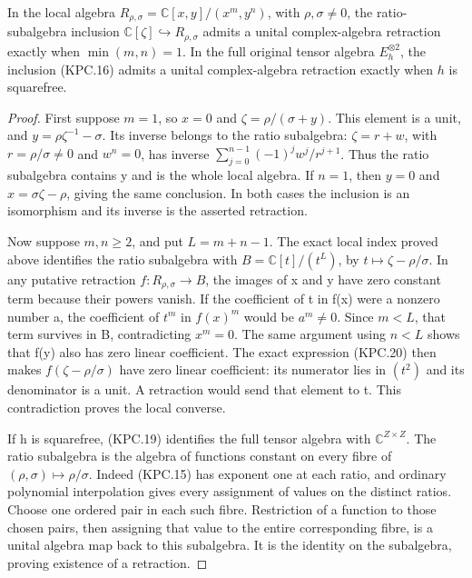 \begin{theorem}
In the local algebra
\(R_{\rho,\sigma}=\mathbb C[x,y]/(x^m,y^n)\), with
\(\rho,\sigma\ne0\), the ratio-subalgebra inclusion
\(\mathbb C[\zeta]\hookrightarrow R_{\rho,\sigma}\)
admits a unital complex-algebra retraction exactly when
\(\min(m,n)=1\).  In the full original tensor algebra
\(E_h^{\otimes2}\), the inclusion (KPC.16) admits a unital
complex-algebra retraction exactly when \(h\) is squarefree.
\end{theorem}

\begin{proof}
First suppose \(m=1\), so \(x=0\) and
\(\zeta=\rho/(\sigma+y)\).  This element is a unit,
and \(y=\rho\zeta^{-1}-\sigma\).  Its inverse belongs
to the ratio subalgebra: \(\zeta=r+w\), with
\(r=\rho/\sigma\ne0\) and \(w^n=0\), has inverse
\(\sum_{j=0}^{n-1}(-1)^jw^j/r^{j+1}\).
Thus the ratio subalgebra contains y and is the whole local
algebra.  If \(n=1\), then \(y=0\) and
\(x=\sigma\zeta-\rho\), giving the same conclusion.
In both cases the inclusion is an isomorphism and its inverse
is the asserted retraction.

Now suppose \(m,n\ge2\), and put \(L=m+n-1\).
The exact local index proved above identifies the ratio
subalgebra with \(B=\mathbb C[t]/(t^L)\), by
\(t\mapsto\zeta-\rho/\sigma\).
In any putative retraction \(f:R_{\rho,\sigma}\to B\),
the images of x and y have zero constant term because their
powers vanish.  If the coefficient of t in f(x) were a
nonzero number a, the coefficient of \(t^m\) in
\(f(x)^m\) would be \(a^m\ne0\).  Since \(m<L\),
that term survives in B, contradicting \(x^m=0\).
The same argument using \(n<L\) shows that f(y) also
has zero linear coefficient.  The exact expression (KPC.20)
then makes \(f(\zeta-\rho/\sigma)\) have zero linear
coefficient: its numerator lies in \((t^2)\) and its
denominator is a unit.  A retraction would send that element
to t.  This contradiction proves the local converse.

If h is squarefree, (KPC.19) identifies the full tensor
algebra with \(\mathbb C^{Z\times Z}\).  The ratio
subalgebra is the algebra of functions constant on every fibre
of \((\rho,\sigma)\mapsto\rho/\sigma\).
Indeed (KPC.15) has exponent one at each ratio, and ordinary
polynomial interpolation gives every assignment of values on
the distinct ratios.  Choose one ordered pair in each such
fibre.  Restriction of a function to those chosen pairs,
then assigning that value to the entire corresponding fibre,
is a unital algebra map back to this subalgebra.  It is the
identity on the subalgebra, proving existence of a retraction.


\end{proof}
